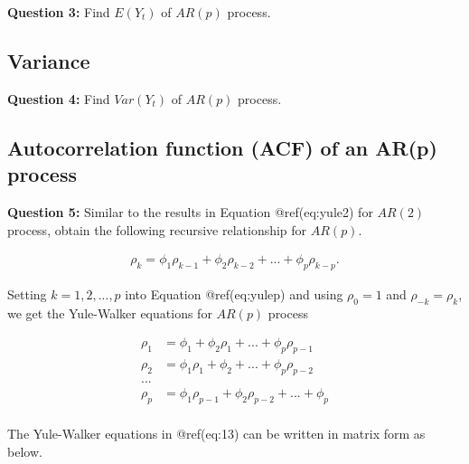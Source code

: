 \documentclass[
  11pt,
  a4paper,
]{report}
\begin{document}
\textbf{Question 3: } Find \(E(Y_t)\) of \(AR(p)\) process.

\subsection{Variance}\label{variance-1}

\textbf{Question 4: } Find \(Var(Y_t)\) of \(AR(p)\) process.

\subsection{Autocorrelation function (ACF) of an AR(p)
process}\label{autocorrelation-function-acf-of-an-arp-process}

\textbf{Question 5: } Similar to the results in Equation @ref(eq:yule2)
for \(AR(2)\) process, obtain the following recursive relationship for
\(AR(p)\).

\begin{align}
\label{eq:yulep}
\rho_k = \phi_1\rho_{k-1}+\phi_2 \rho_{k-2} + ... + \phi_p \rho_{k-p}.
\end{align}

Setting \(k=1, 2, ..., p\) into Equation @ref(eq:yulep) and using
\(\rho_0=1\) and \(\rho_{-k}=\rho_k\), we get the Yule-Walker equations
for \(AR(p)\) process

\begin{equation}
  \label{eq:13}
\begin{aligned}
  \rho_1 &= \phi_1+\phi_2 \rho_{1} + ... + \phi_p \rho_{p-1}\\
  \rho_2 &= \phi_1 \rho_1+\phi_2  + ... + \phi_p \rho_{p-2}\\
  ... \\
  \rho_p &= \phi_1 \rho_{p-1} +\phi_2 \rho_{p-2}  + ... + \phi_p \\
\end{aligned}
\end{equation}

The Yule-Walker equations in @ref(eq:13) can be written in matrix form
as below.
\end{document}
